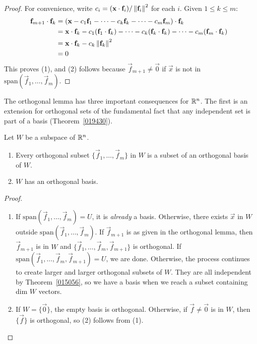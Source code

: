 \documentclass{ximera}
\begin{document}
\begin{proof}
For convenience, write $c_{i} = (\mathbf{x} \cdot \mathbf{f}_{i}) / \left\lVert\mathbf{f}_{i}\right\rVert^{2}$ for each $i$. Given $1 \leq k \leq m$:
\begin{align*}
\mathbf{f}_{m+1} \cdot \mathbf{f}_{k}
&= (\mathbf{x} - c_{1}\mathbf{f}_{1} - \dots -c_{k}\mathbf{f}_{k} - \dots -c_{m}\mathbf{f}_{m}) \cdot \mathbf{f}_{k} \\
&= \mathbf{x} \cdot \mathbf{f}_{k} - c_{1}(\mathbf{f}_{1} \cdot \mathbf{f}_{k}) - \dots -c_{k}(\mathbf{f}_{k} \cdot \mathbf{f}_{k}) - \dots -c_{m}(\mathbf{f}_{m} \cdot \mathbf{f}_{k}) \\
&= \mathbf{x} \cdot \mathbf{f}_{k} - c_{k} \left\lVert\mathbf{f}_{k}\right\rVert^2 \\
&= 0
\end{align*}
This proves (1), and (2) follows because $\vec{f}_{m + 1} \neq \vec{0}$ if $\vec{x}$ is not in $\mbox{span}\left(\vec{f}_{1}, \dots , \vec{f}_{m}\right)$.
\end{proof}

The orthogonal lemma has three important consequences for $\mathbb{R}^n$. The first is an extension for orthogonal sets of the fundamental fact that any independent set is part of a basis (Theorem~\ref{019430}).


\begin{theorem}\label{023635}
Let $W$ be a subspace of $\mathbb{R}^n$.


\begin{enumerate}
\item\label{023635a} Every orthogonal subset $\{\vec{f}_{1}, \dots , \vec{f}_{m}\}$ in $W$ is a subset of an orthogonal basis of $W$.

\item\label{023635b} $W$ has an orthogonal basis.

\end{enumerate}
\end{theorem}



\begin{proof}
\begin{enumerate}
\item If $\mbox{span}\left(\vec{f}_{1}, \dots , \vec{f}_{m}\right) = U$, it is \textit{already} a basis. Otherwise, there exists $\vec{x}$ in $W$ outside $\mbox{span}\left(\vec{f}_{1}, \dots , \vec{f}_{m}\right)$. If $\vec{f}_{m+1}$ is as given in the orthogonal lemma, then $\vec{f}_{m+1}$ is in $W$ and $\{\vec{f}_{1}, \dots , \vec{f}_{m}, \vec{f}_{m+1}\}$ is orthogonal. If $\mbox{span}\left(\vec{f}_{1}, \dots, \vec{f}_{m}, \vec{f}_{m+1}\right) = U$, we are done. Otherwise, the process continues to create larger and larger orthogonal subsets of $W$. They are all independent by Theorem~\ref{015056}, so we have a basis when we reach a subset containing dim $W$ vectors.

\item If $W = \{\vec{0}\}$, the empty basis is orthogonal. Otherwise, if $\vec{f} \neq \vec{0}$ is in $W$, then $\{\vec{f}\}$ is orthogonal, so (2) follows from (1).
\end{enumerate}
\end{proof}
\end{document}
